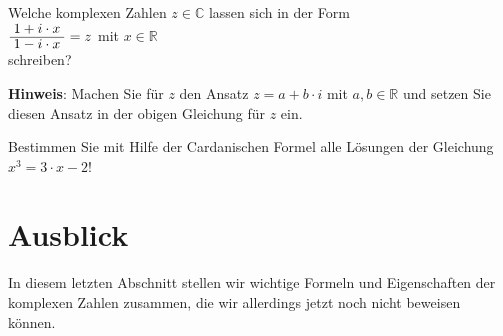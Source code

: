 \exercise
Welche komplexen Zahlen $z \in \mathbb{C}$ lassen sich in der Form
\\[0.2cm]
\hspace*{1.3cm}
$\bruch{1 + i \cdot x}{1 - i \cdot x} = z$ \quad mit $x \in \mathbb{R}$
\\[0.2cm]
schreiben? 
\vspace*{0.2cm}

\noindent
\textbf{Hinweis}:  Machen Sie für $z$ den Ansatz $z = a + b \cdot i$ mit $a,b \in \mathbb{R}$ und
setzen Sie diesen Ansatz in der obigen Gleichung für $z$ ein.  
\exend

\exercise
Bestimmen Sie mit Hilfe der Cardanischen Formel alle Lösungen der Gleichung 
\\[0.2cm]
\hspace*{1.3cm}
$x^3 = 3 \cdot x - 2$!
\exend


\section{Ausblick}
In diesem letzten Abschnitt stellen wir wichtige Formeln und Eigenschaften der komplexen Zahlen
zusammen, die wir allerdings jetzt noch nicht beweisen können.


